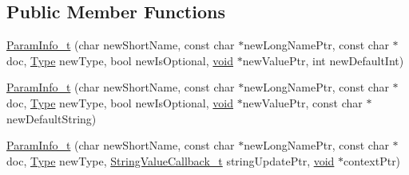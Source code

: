 \subsection*{Public Member Functions}
\begin{DoxyCompactItemize}
\item 
\hyperlink{structcli_1_1args_1_1_param_info__t_a8fb9aa14af6813c4fe7010e3cf7e0185}{Param\+Info\+\_\+t} (char new\+Short\+Name, const char $\ast$new\+Long\+Name\+Ptr, const char $\ast$doc, \hyperlink{structcli_1_1args_1_1_param_info__t_a7f4d580e3970c35519b05e538cfef71a}{Type} new\+Type, bool new\+Is\+Optional, \hyperlink{_t_e_m_p_l_a_t_e__cdef_8h_ac9c84fa68bbad002983e35ce3663c686}{void} $\ast$new\+Value\+Ptr, int new\+Default\+Int)
\item 
\hyperlink{structcli_1_1args_1_1_param_info__t_afe9cef477cd545ec227bd727912a0e66}{Param\+Info\+\_\+t} (char new\+Short\+Name, const char $\ast$new\+Long\+Name\+Ptr, const char $\ast$doc, \hyperlink{structcli_1_1args_1_1_param_info__t_a7f4d580e3970c35519b05e538cfef71a}{Type} new\+Type, bool new\+Is\+Optional, \hyperlink{_t_e_m_p_l_a_t_e__cdef_8h_ac9c84fa68bbad002983e35ce3663c686}{void} $\ast$new\+Value\+Ptr, const char $\ast$new\+Default\+String)
\item 
\hyperlink{structcli_1_1args_1_1_param_info__t_a9f02093ffad4a43820334776fdfa74ab}{Param\+Info\+\_\+t} (char new\+Short\+Name, const char $\ast$new\+Long\+Name\+Ptr, const char $\ast$doc, \hyperlink{structcli_1_1args_1_1_param_info__t_a7f4d580e3970c35519b05e538cfef71a}{Type} new\+Type, \hyperlink{namespacecli_1_1args_aa08565ab872ff119b0a21d4bbe1d8e4e}{String\+Value\+Callback\+\_\+t} string\+Update\+Ptr, \hyperlink{_t_e_m_p_l_a_t_e__cdef_8h_ac9c84fa68bbad002983e35ce3663c686}{void} $\ast$context\+Ptr)
\end{DoxyCompactItemize}
